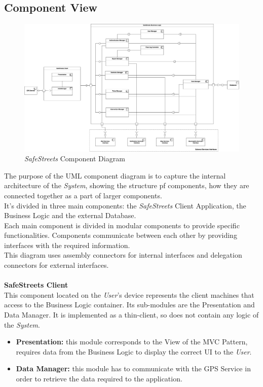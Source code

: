 \documentclass{article}
\begin{document}
	\subsection{Component View}
		\begin{figure}[H]
			\centering
			\includegraphics[scale=0.20]{Images/Diagrams/component_diagram.png}
			\caption{{\it SafeStreets} Component Diagram}
		\end{figure}
		The purpose of the UML component diagram is to capture the internal architecture of the {\it System}, showing the structure pf components, how they are connected together as a part of larger components. \\
		It's divided in three main components: the {\it SafeStreets} Client Application, the Business Logic and the external Database. \\ 
		Each main component is divided in modular components to provide specific functionalities. Components communicate between each other by providing interfaces with the required information. \\
		This diagram uses assembly connectors for internal interfaces and delegation connectors for external interfaces. 
		\\ \\
		{\bf SafeStreets Client} \\
		This component located on the {\it User}'s device represents the client machines that access to the Business Logic container. Its sub-modules are the Presentation and Data Manager. It is implemented as a thin-client, so does not contain any logic of the {\it System}.
		\begin{itemize}
		\item {\bf Presentation:} this module corresponds to the View of the MVC Pattern, requires data from the Business Logic to display the correct UI to the {\it User}.
		\item {\bf Data Manager:} this module has to communicate with the GPS Service in order to retrieve the data required to the application. 
		\end{itemize} 
\end{document}
